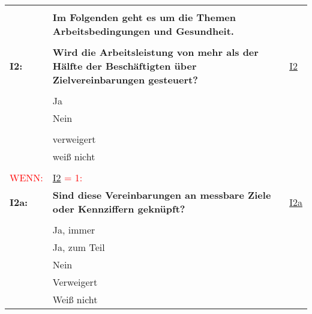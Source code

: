 \begin{longtable}{!{\color{black}\vline width 1pt}  L{2cm}!{\color{black}\vline width 1pt} L{12.25cm}!{\color{black}\vline width 1pt}  L{2.5cm}!{\color{black}\vline width 1pt}}
   &  &  \\ 
   & \textbf{Im Folgenden geht es um die Themen Arbeitsbedingungen und Gesundheit.} &  \\ 
   &  &  \\ 
   \midrule
{}\textbf{I2:}\label{I2} & \textbf{Wird die Arbeitsleistung von mehr als der Hälfte der Beschäftigten über Zielvereinbarungen gesteuert?} & \hyperref[var:I2]{I2} \\ 
   &  &  \\ 
   & Ja &  \\ 
   & Nein &  \\ 
   &  &  \\ 
   & verweigert &  \\ 
   & weiß nicht &  \\ 
   &  &  \\ 
   \midrule
{}\textcolor{red}{WENN:} & \textcolor{red}{ \hyperref[I2]{I2} = 1:} &  \\ 
  \textbf{I2a:}\label{I2a} & \textbf{Sind diese Vereinbarungen an messbare Ziele oder Kennziffern geknüpft?} & \hyperref[var:I2a]{I2a} \\ 
   &  &  \\ 
   & Ja, immer &  \\ 
   & Ja, zum Teil &  \\ 
   & Nein &  \\ 
   & Verweigert &  \\ 
   & Weiß nicht &  \\ 

\end{longtable}
